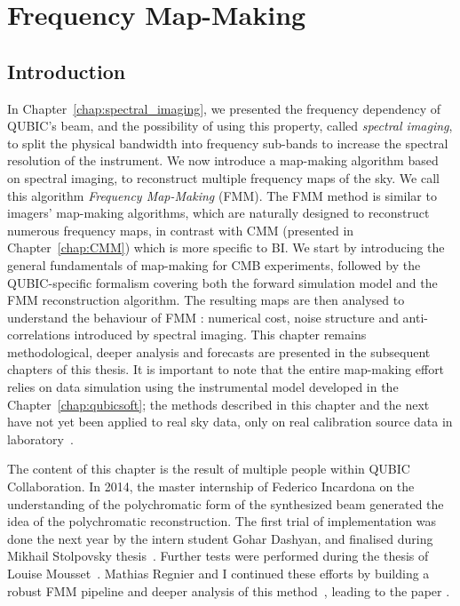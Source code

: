 \documentclass[../../thesis.tex]{subfiles}
\begin{document}
\chapter{Frequency Map-Making} \label{chap:FMM}

\ifSubfilesClassLoaded{
    \tableofcontents
}{
    \minitoc
}

\section*{Introduction}

In Chapter~\ref{chap:spectral_imaging}, we presented the frequency dependency of QUBIC's beam, and the possibility of using this property, called \emph{spectral imaging}, to split the physical bandwidth into frequency sub-bands to increase the spectral resolution of the instrument. We now introduce a map-making algorithm based on spectral imaging, to reconstruct multiple frequency maps of the sky. We call this algorithm \emph{Frequency Map-Making} (FMM). The FMM method is similar to imagers' map-making algorithms, which are naturally designed to reconstruct numerous frequency maps, in contrast with CMM (presented in Chapter~\ref{chap:CMM}) which is more specific to BI.
We start by introducing the general fundamentals of map-making for CMB experiments, followed by the QUBIC-specific formalism covering both the forward simulation model and the FMM reconstruction algorithm. The resulting maps are then analysed to understand the behaviour of FMM : numerical cost, noise structure and anti-correlations introduced by spectral imaging. This chapter remains methodological, deeper analysis and forecasts are presented in the subsequent chapters of this thesis. It is important to note that the entire map-making effort relies on data simulation using the instrumental model developed in the Chapter~\ref{chap:qubicsoft}; the methods described in this chapter and the next have not yet been applied to real sky data, only on real calibration source data in laboratory~\cite{QUBICII,QUBICIII}.

The content of this chapter is the result of multiple people within QUBIC Collaboration. In 2014, the master internship of Federico Incardona on the understanding of the polychromatic form of the synthesized beam generated the idea of the polychromatic reconstruction. The first trial of implementation was done the next year by the intern student Gohar Dashyan, and finalised during Mikhail Stolpovsky thesis~\cite{thesismikhail}. Further tests were performed during the thesis of Louise Mousset~\cite{thesislouise}. Mathias Regnier and I continued these efforts by building a robust FMM pipeline and deeper analysis of this method~\cite{mathiasthesis}, leading to the paper \cite{FMM}. \\
\end{document}

